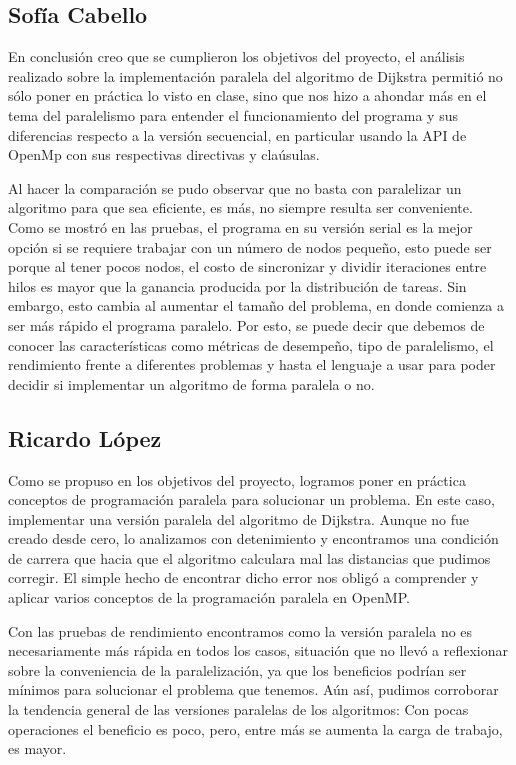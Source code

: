 \documentclass[11pt]{article}
\begin{document}
\subsection{Sofía Cabello}
En conclusión creo que se cumplieron los objetivos del proyecto, el análisis realizado sobre la implementación paralela del algoritmo de Dijkstra permitió no sólo poner en práctica lo visto en clase, sino que nos hizo a ahondar más en el tema del paralelismo para entender el funcionamiento del programa y sus diferencias respecto a la versión secuencial, en particular usando la API de OpenMp con sus respectivas directivas y claúsulas. 
\par
Al hacer la comparación se pudo observar que no basta  con paralelizar un algoritmo para que sea eficiente, es más, no siempre resulta ser conveniente. Como se mostró en las pruebas, el programa en su versión serial es la mejor opción si se requiere trabajar con un número de nodos pequeño, esto puede ser porque al tener pocos nodos, el costo de sincronizar y dividir iteraciones entre hilos es mayor que la ganancia producida por la distribución de tareas. Sin embargo, esto cambia al aumentar el tamaño del problema, en donde comienza a ser más rápido el programa paralelo. Por esto, se puede decir que debemos de conocer las características como métricas de desempeño, tipo de paralelismo, el rendimiento frente a diferentes problemas y hasta el lenguaje a usar para poder decidir si implementar un algoritmo de forma paralela o no.  

\subsection{Ricardo López}

Como se propuso en los objetivos del proyecto, logramos poner en práctica conceptos de programación paralela para solucionar un problema. En este caso, implementar una versión paralela del algoritmo de Dijkstra. Aunque no fue creado desde cero, lo analizamos con detenimiento y encontramos una condición de carrera que hacia que el algoritmo calculara mal las distancias que pudimos corregir. El simple hecho de encontrar dicho error nos obligó a comprender y aplicar varios conceptos de la programación paralela en OpenMP.
\par 
Con las pruebas de rendimiento encontramos como la versión paralela no es necesariamente más rápida en todos los casos, situación que no llevó a reflexionar sobre la conveniencia de la paralelización, ya que los beneficios  podrían ser  mínimos para solucionar el problema que tenemos. Aún así, pudimos corroborar la tendencia general de las versiones paralelas de los algoritmos: Con pocas operaciones el beneficio es poco, pero, entre más se aumenta la carga de trabajo, es mayor. 
\end{document}
